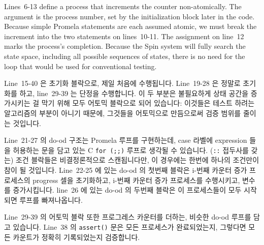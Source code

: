 Lines~6-13 define a process that increments the counter non-atomically.
The argument  is the process number, set by the initialization
block later in the code.
Because simple Promela statements are each assumed atomic, we must
break the increment into the two statements on lines~10-11.
The assignment on line~12 marks the process's completion.
Because the Spin system will fully search the state space, including
all possible sequences of states, there is no need for the loop
that would be used for conventional testing.
\fi

Line~15-40 은 초기화 블락으로, 제일 처음에 수행됩니다.
Line~19-28 은 정말로 초기화를 하고, line~29-39 는 단정을 수행합니다.
이 두 부분은 불필요하게 상태 공간을 증가시키는 걸 막기 위해 모두 어토믹
블락으로 되어 있습니다: 이것들은 테스트 하려는 알고리즘의 부분이 아니기 때문에,
그것들을 어토믹으로 만듬으로써 검증 범위를 줄이는 것입니다.

Line~21-27 의 do-od 구조는 Promela 루프를 구현하는데, case 라벨에 expression
들을 허용하는  문을 담고 있는 C {\tt for (;;)} 루프로 생각될 수
있습니다.
({\tt ::} 접두사를 갖는) 조건 블락들은 비결정론적으로 스캔됩니다만, 이 경우에는
한번에 하나의 조건만이 참이 될 것입니다.
Line~22-25 에 있는 do-od 의 첫번째 블락은 i-번째 카운터 증가 프로세스의
progress 셀을 초기화하고, i-번째 카운터 증가 프로세스를 수행시키고, 변수 
를 증가시킵니다.
line~26 에 있는 do-od 의 두번째 블락은 이 프로세스들이 모두 시작되면 루프를
빠져나옵니다.
\iffalse

Lines~15-40 are the initialization block, which is executed first.
Lines~19-28 actually do the initialization, while lines~29-39
perform the assertion.
Both are atomic blocks in order to avoid unnecessarily increasing
the state space: because they are not part of the algorithm proper,
we lose no verification coverage by making them atomic.

The do-od construct on lines~21-27 implements a Promela loop,
which can be thought of as a C {\tt for (;;)} loop containing a
\co{switch} statement that allows expressions in case labels.
The condition blocks (prefixed by {\tt ::})
are scanned non-deterministically,
though in this case only one of the conditions can possibly hold at a given
time.
The first block of the do-od from lines~22-25 initializes the i-th
incrementer's progress cell, runs the i-th incrementer's process, and
then increments the variable \co{i}.
The second block of the do-od on line~26 exits the loop once
these processes have been started.
\fi

Line~29-39 의 어토믹 블락 또한 프로그레스 카운터를 더하는, 비슷한 do-od 루프를
담고 있습니다.
Line~38 의 {\tt assert()} 문은 모든 프로세스가 완료되었는지, 그렇다면 모든
카운트가 정확히 기록되었는지 검증합니다.

